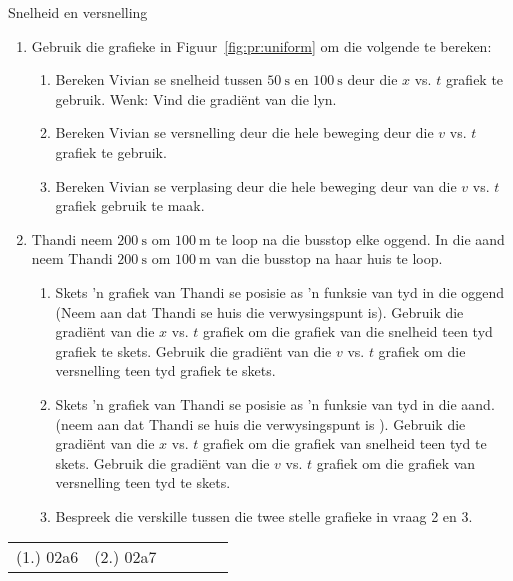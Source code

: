 \begin{exercises}{Snelheid en versnelling}
\begin{enumerate}[noitemsep, label=\textbf{\arabic*}. ] 
\item Gebruik die grafieke in Figuur~\ref{fig:pr:uniform} om die volgende te bereken:
\begin{enumerate}[noitemsep, label=\textbf{\alph*}. ] 
    \item Bereken Vivian se snelheid tussen $50~\text{s}$ en $100~\text{s}$ deur die $x$ vs. $t$ grafiek te gebruik. Wenk: Vind die gradi\"ent van die lyn.
    \item Bereken Vivian se versnelling deur die hele beweging deur die $v$ vs. $t$ grafiek te gebruik.
    \item Bereken Vivian se verplasing deur die hele beweging deur van die $v$ vs. $t$ grafiek gebruik te maak.
\end{enumerate}

\item Thandi neem $200~\text{s}$ om  $100~\text{m}$ te loop na die busstop elke oggend. In die aand neem Thandi $200~\text{s}$ om $100~\text{m}$ van die busstop na haar huis te loop.

\begin{enumerate}[noitemsep, label=\textbf{\alph*}. ] 
    \item  Skets 'n grafiek van Thandi se posisie as 'n funksie van tyd in die oggend (Neem aan dat Thandi se huis die verwysingspunt is). Gebruik die gradi\"ent van die $x$ vs. $t$ grafiek om die grafiek van die snelheid teen tyd grafiek te skets. Gebruik die gradi\"ent van die $v$ vs. $t$ grafiek om die versnelling teen tyd grafiek te skets.
    \item  Skets 'n grafiek van Thandi se posisie as 'n funksie van tyd in die aand. (neem aan dat Thandi se huis die verwysingspunt is ). Gebruik die gradi\"ent van die $x$ vs. $t$ grafiek om die grafiek van snelheid teen tyd te skets. Gebruik die gradi\"ent van die $v$ vs. $t$ grafiek om die grafiek van versnelling teen tyd te skets.
    \item Bespreek die verskille tussen die twee stelle grafieke in vraag 2 en 3.
\end{enumerate}
\end{enumerate}

\practiceinfo
\par \begin{tabular}[h]{cccccc}
(1.) 02a6  &  (2.) 02a7  & \end{tabular}
\end{exercises}




